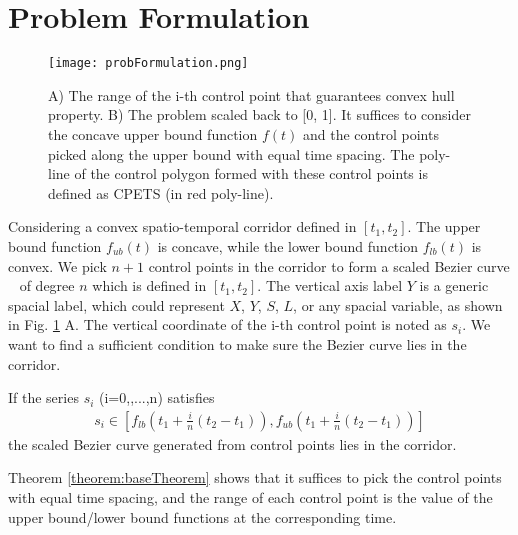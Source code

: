 \section{Problem Formulation} \label{ProblemFormulation}

\begin{figure}[tbp]
\begin{center}
\texttt{[image: probFormulation.png]}
\end{center}
\vspace{-0.2 in}
\caption{A) The range of the i-th control point that guarantees convex hull property. B) The problem scaled back to [0, 1]. It suffices to consider the concave upper bound function $f(t)$ and the control points picked along the upper bound with equal time spacing. The poly-line of the control polygon formed with these control points is defined as CPETS (in red poly-line).}
\label{Fig:probFormulation}
\vspace{-0.2 in}
\end{figure}

Considering a convex spatio-temporal corridor defined in $\left[t_{1}, t_{2}\right]$. The upper bound function $f_{ub}(t)$ is concave, while the lower bound function $f_{lb}(t)$ is convex. We pick $n+1$ control points in the corridor to form a scaled Bezier curve ~\cite{ding2019safe} of degree $n$ which is defined in $\left[t_{1}, t_{2}\right]$. The vertical axis label $Y$ is a generic spacial label, which could represent $X$, $Y$, $S$, $L$, or any spacial variable, as shown in Fig. \ref{Fig:probFormulation} A. The vertical coordinate of the i-th control point is noted as $s_{i}$. We want to find a sufficient condition to make sure the Bezier curve lies in the corridor.

\begin{theorem}
If the series $s_{i}$ (i=0,,\;...,\;n) satisfies
\begin{equation}\begin{split}
s_{i} \in \left[f_{lb}(t_{1}+\frac{i}{n}(t_{2}-t_{1})), f_{ub}(t_{1}+\frac{i}{n}(t_{2}-t_{1}))\right]
\label{eq.0}
\end{split}\end{equation}
the scaled Bezier curve generated from control points lies in the corridor.
\label{theorem:baseTheorem}
\end{theorem}

Theorem \ref{theorem:baseTheorem} shows that it suffices to pick the control points with equal time spacing, and the range of each control point is the value of the upper bound/lower bound functions at the corresponding time. 

